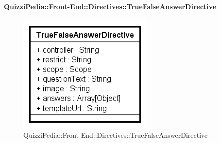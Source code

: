 
		\paragraph{QuizziPedia::Front-End::Directives::TrueFalseAnswerDirective}
		
		\label{QuizziPedia::Front-End::Directives::TrueFalseAnswerDirective}
		
		\begin{figure}[ht]
			\centering
			\includegraphics[scale=0.80,keepaspectratio]{UML/Classi/Front-End/QuizziPedia_Front-end_Templates_TrueFalseAnswerTemplate.png}
			\caption{QuizziPedia::Front-End::Directives::TrueFalseAnswerDirective}
		\end{figure} \FloatBarrier
		
